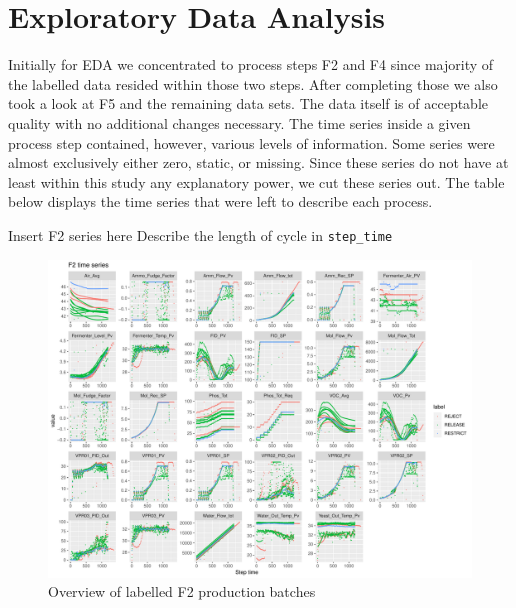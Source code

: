 \documentclass{article}
\begin{document}
\section{Exploratory Data Analysis}
Initially for EDA we concentrated to process steps F2 and F4 since majority of the labelled data resided within those two steps. After completing those we also took a look at F5 and the remaining data sets. The data itself is of acceptable quality with no additional changes necessary. The time series inside a given process step contained, however, various levels of information. Some series were almost exclusively either zero, static, or missing. Since these series do not have at least within this study any explanatory power, we cut these series out. The table below displays the time series that were left to describe each process.

Insert F2 series here
Describe the length of cycle in \texttt{step\_time}
\begin{figure}
    \centering
    \includegraphics[width=1.0\textwidth]{f2_plot}
    \caption{Overview of labelled F2 production batches}
    \label{fig:f2series}
\end{figure}
\end{document}
